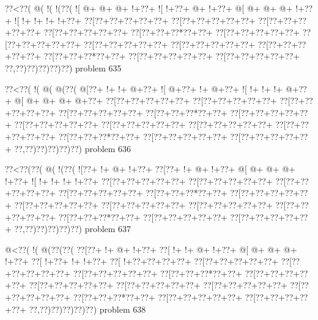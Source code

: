 \vbox{\vbox{\goo
\0??<\0??(\- @(\- !(\- !(\0??(
\- ![\- @+\- @+\- @+\- !+\0??+
\- ![\- !+\0??+\- @+\- !+\0??+
\- @[\- @+\- @+\- @+\- !+\0??+
\- ![\- !+\- !+\- !+\- !+\0??+
\0??[\0??+\0??+\0??+\0??+\0??+
\0??[\0??+\0??+\0??+\0??+\0??+
\0??[\0??+\0??+\0??+\0??+\0??+
\0??[\0??+\0??+\0??+\0??+\0??+
\0??[\0??+\0??+\0??*\0??+\0??+
\0??[\0??+\0??+\0??+\0??+\0??+
\0??[\0??+\0??+\0??+\0??+\0??+
\0??[\0??+\0??+\0??+\0??+\0??+
\0??[\0??+\0??+\0??+\0??+\0??+
\0??[\0??+\0??+\0??+\0??+\0??+
\0??[\0??+\0??+\0??*\0??+\0??+
\0??[\0??+\0??+\0??+\0??+\0??+
\0??[\0??+\0??+\0??+\0??+\0??+
\0??,\0??)\0??)\0??)\0??)\0??)
}
\hfil problem 635\hfil\break
}

\vbox{\vbox{\goo
\0??<\0??(\- !(\- @(\- @(\0??(
\- @[\0??+\- !+\- !+\- @+\0??+
\- ![\- @+\0??+\- !+\- @+\0??+
\- ![\- !+\- !+\- !+\- @+\0??+
\- @[\- @+\- @+\- @+\- @+\0??+
\0??[\0??+\0??+\0??+\0??+\0??+
\0??[\0??+\0??+\0??+\0??+\0??+
\0??[\0??+\0??+\0??+\0??+\0??+
\0??[\0??+\0??+\0??+\0??+\0??+
\0??[\0??+\0??+\0??*\0??+\0??+
\0??[\0??+\0??+\0??+\0??+\0??+
\0??[\0??+\0??+\0??+\0??+\0??+
\0??[\0??+\0??+\0??+\0??+\0??+
\0??[\0??+\0??+\0??+\0??+\0??+
\0??[\0??+\0??+\0??+\0??+\0??+
\0??[\0??+\0??+\0??*\0??+\0??+
\0??[\0??+\0??+\0??+\0??+\0??+
\0??[\0??+\0??+\0??+\0??+\0??+
\0??,\0??)\0??)\0??)\0??)\0??)
}
\hfil problem 636\hfil\break
}

\vbox{\vbox{\goo
\0??<\0??(\0??(\- @(\- !(\0??(
\- ![\0??+\- !+\- @+\- !+\0??+
\0??[\0??+\- !+\- @+\- !+\0??+
\- @[\- @+\- @+\- @+\- !+\0??+
\- ![\- !+\- !+\- !+\- !+\0??+
\0??[\0??+\0??+\0??+\0??+\0??+
\0??[\0??+\0??+\0??+\0??+\0??+
\0??[\0??+\0??+\0??+\0??+\0??+
\0??[\0??+\0??+\0??+\0??+\0??+
\0??[\0??+\0??+\0??*\0??+\0??+
\0??[\0??+\0??+\0??+\0??+\0??+
\0??[\0??+\0??+\0??+\0??+\0??+
\0??[\0??+\0??+\0??+\0??+\0??+
\0??[\0??+\0??+\0??+\0??+\0??+
\0??[\0??+\0??+\0??+\0??+\0??+
\0??[\0??+\0??+\0??*\0??+\0??+
\0??[\0??+\0??+\0??+\0??+\0??+
\0??[\0??+\0??+\0??+\0??+\0??+
\0??,\0??)\0??)\0??)\0??)\0??)
}
\hfil problem 637\hfil\break
}

\vbox{\vbox{\goo
\- @<\0??(\- !(\- @(\0??(\0??(
\0??[\0??+\- !+\- @+\- !+\0??+
\0??[\- !+\- !+\- @+\- !+\0??+
\- @[\- @+\- @+\- @+\- !+\0??+
\0??[\- !+\0??+\- !+\- !+\0??+
\0??[\- !+\0??+\0??+\0??+\0??+
\0??[\0??+\0??+\0??+\0??+\0??+
\0??[\0??+\0??+\0??+\0??+\0??+
\0??[\0??+\0??+\0??+\0??+\0??+
\0??[\0??+\0??+\0??*\0??+\0??+
\0??[\0??+\0??+\0??+\0??+\0??+
\0??[\0??+\0??+\0??+\0??+\0??+
\0??[\0??+\0??+\0??+\0??+\0??+
\0??[\0??+\0??+\0??+\0??+\0??+
\0??[\0??+\0??+\0??+\0??+\0??+
\0??[\0??+\0??+\0??*\0??+\0??+
\0??[\0??+\0??+\0??+\0??+\0??+
\0??[\0??+\0??+\0??+\0??+\0??+
\0??,\0??)\0??)\0??)\0??)\0??)
}
\hfil problem 638\hfil\break
}

